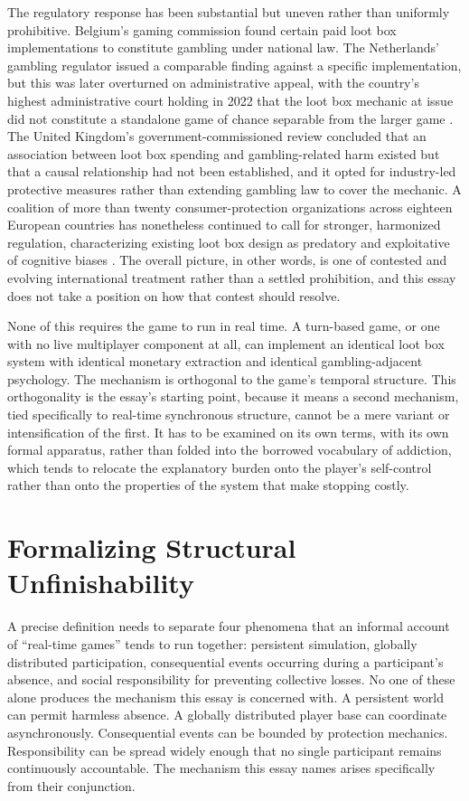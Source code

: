 \documentclass[11pt]{article}
\begin{document}
The regulatory response has been substantial but uneven rather than uniformly prohibitive. Belgium's gaming commission found certain paid loot box implementations to constitute gambling under national law. The Netherlands' gambling regulator issued a comparable finding against a specific implementation, but this was later overturned on administrative appeal, with the country's highest administrative court holding in 2022 that the loot box mechanic at issue did not constitute a standalone game of chance separable from the larger game \cite{xiao2021}. The United Kingdom's government-commissioned review concluded that an association between loot box spending and gambling-related harm existed but that a causal relationship had not been established, and it opted for industry-led protective measures rather than extending gambling law to cover the mechanic. A coalition of more than twenty consumer-protection organizations across eighteen European countries has nonetheless continued to call for stronger, harmonized regulation, characterizing existing loot box design as predatory and exploitative of cognitive biases \cite{nccreport2022}. The overall picture, in other words, is one of contested and evolving international treatment rather than a settled prohibition, and this essay does not take a position on how that contest should resolve.

None of this requires the game to run in real time. A turn-based game, or one with no live multiplayer component at all, can implement an identical loot box system with identical monetary extraction and identical gambling-adjacent psychology. The mechanism is orthogonal to the game's temporal structure. This orthogonality is the essay's starting point, because it means a second mechanism, tied specifically to real-time synchronous structure, cannot be a mere variant or intensification of the first. It has to be examined on its own terms, with its own formal apparatus, rather than folded into the borrowed vocabulary of addiction, which tends to relocate the explanatory burden onto the player's self-control rather than onto the properties of the system that make stopping costly.

\section{Formalizing Structural Unfinishability}

A precise definition needs to separate four phenomena that an informal account of ``real-time games'' tends to run together: persistent simulation, globally distributed participation, consequential events occurring during a participant's absence, and social responsibility for preventing collective losses. No one of these alone produces the mechanism this essay is concerned with. A persistent world can permit harmless absence. A globally distributed player base can coordinate asynchronously. Consequential events can be bounded by protection mechanics. Responsibility can be spread widely enough that no single participant remains continuously accountable. The mechanism this essay names arises specifically from their conjunction.
\end{document}
